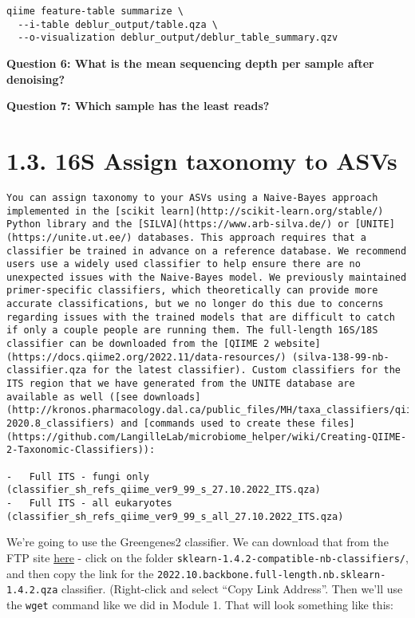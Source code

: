 \documentclass[
]{book}
\begin{document}
\begin{verbatim}
qiime feature-table summarize \
  --i-table deblur_output/table.qza \
  --o-visualization deblur_output/deblur_table_summary.qzv
\end{verbatim}

\textbf{Question 6: What is the mean sequencing depth per sample after denoising?}

\textbf{Question 7: Which sample has the least reads?}

\section{1.3. 16S Assign taxonomy to ASVs}\label{s-assign-taxonomy-to-asvs}

\begin{verbatim}
You can assign taxonomy to your ASVs using a Naive-Bayes approach implemented in the [scikit learn](http://scikit-learn.org/stable/) Python library and the [SILVA](https://www.arb-silva.de/) or [UNITE](https://unite.ut.ee/) databases. This approach requires that a classifier be trained in advance on a reference database. We recommend users use a widely used classifier to help ensure there are no unexpected issues with the Naive-Bayes model. We previously maintained primer-specific classifiers, which theoretically can provide more accurate classifications, but we no longer do this due to concerns regarding issues with the trained models that are difficult to catch if only a couple people are running them. The full-length 16S/18S classifier can be downloaded from the [QIIME 2 website](https://docs.qiime2.org/2022.11/data-resources/) (silva-138-99-nb-classifier.qza for the latest classifier). Custom classifiers for the ITS region that we have generated from the UNITE database are available as well ([see downloads](http://kronos.pharmacology.dal.ca/public_files/MH/taxa_classifiers/qiime2-2020.8_classifiers) and [commands used to create these files](https://github.com/LangilleLab/microbiome_helper/wiki/Creating-QIIME-2-Taxonomic-Classifiers)):

-   Full ITS - fungi only (classifier_sh_refs_qiime_ver9_99_s_27.10.2022_ITS.qza)
-   Full ITS - all eukaryotes (classifier_sh_refs_qiime_ver9_99_s_all_27.10.2022_ITS.qza)
\end{verbatim}

We're going to use the Greengenes2 classifier. We can download that from the FTP site \href{http://ftp.microbio.me/greengenes_release/2022.10/}{here} - click on the folder \texttt{sklearn-1.4.2-compatible-nb-classifiers/}, and then copy the link for the \texttt{2022.10.backbone.full-length.nb.sklearn-1.4.2.qza} classifier. (Right-click and select ``Copy Link Address''. Then we'll use the \texttt{wget} command like we did in Module 1. That will look something like this:
\end{document}
